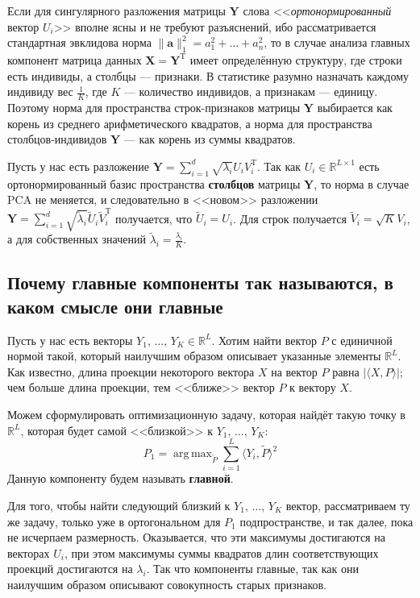 \documentclass[12pt,a4paper,final]{article}
\DeclareMathOperator*{\argmax}{arg\,max}
\begin{document}
Если для сингулярного разложения матрицы $\bm Y$ слова 
<<\textit{ортонормированный} вектор $U_i$>>
вполне ясны и не требуют разъяснений, ибо рассматривается стандартная эвклидова норма $\|\bm a\|^2_1 = a_1^2 + \ldots + a_n^2$, то в случае анализа главных компонент матрица данных $\bm X = \bm Y^\mathrm{T}$ имеет определённую структуру, где строки есть индивиды, а столбцы --- признаки. В статистике разумно назначать каждому индивиду вес $\frac{1}{K}$, где $K$ --- количество индивидов, а признакам --- единицу. Поэтому норма для пространства строк-признаков матрицы $\bm Y$ выбирается как корень из среднего арифметического квадратов, а норма для пространства столбцов-индивидов $\bm Y$ --- как корень из суммы квадратов. 

Пусть у нас есть разложение $\bm Y = \sum_{i = 1}^d \sqrt{\lambda_i} U_i V_i^\mathrm{T}$. Так как $U_i \in \mathbb R^{L \times 1}$ есть ортонормированный базис пространства \textbf{столбцов} матрицы $\bm Y$, то норма в случае PCA не меняется, и следовательно в <<новом>> разложении $\bm Y = \sum_{i = 1}^d \sqrt{\widetilde \lambda_i} \widetilde U_i \widetilde V_i^\mathrm{T}$ получается, что $\widetilde U_i = U_i$. Для строк получается $\widetilde V_i = \sqrt{K}{V_i}$, а для собственных значений $\widetilde \lambda_i = \frac{\lambda_i}{K}$.

\subsection{Почему главные компоненты так называются, в каком смысле они главные}

Пусть у нас есть векторы $Y_1,\,\ldots,\, Y_K \in \mathbb{R}^L$. Хотим найти вектор $P$ с единичной нормой такой, который наилучшим образом описывает указанные элементы $\mathbb R^L$. Как известно,  длина проекции некоторого вектора $X$ на вектор $P$ равна $|\langle X, P \rangle|$; чем больше длина проекции, тем <<ближе>> вектор $P$ к вектору $X$. 

Можем сформулировать оптимизационную задачу, которая найдёт такую точку в $\mathbb R^L$, которая будет самой <<близкой>> к $Y_1,\,\ldots,\, Y_K$:
$$
P_1 = \argmax_{\widetilde P}{\sum_{i = 1}^{L}{\langle Y_i, \widetilde{P} \rangle ^2}}
$$
Данную компоненту будем называть \textbf{главной}.

Для того, чтобы найти следующий близкий к $Y_1,\,\ldots,\, Y_K$ вектор, рассматриваем ту же задачу, только уже в ортогональном для $P_1$ подпространстве, и так далее, пока не исчерпаем размерность.
Оказывается, что эти максимумы достигаются на векторах $U_i$, при этом максимумы суммы квадратов длин соответствующих проекций достигаются на $\lambda_i$. Так что компоненты главные, так как они наилучшим образом описывают совокупность старых признаков.
\end{document}
